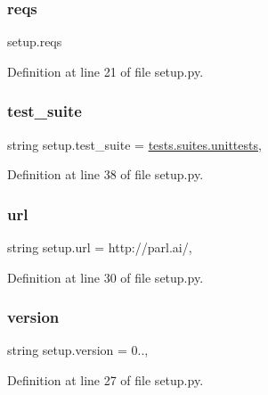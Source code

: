 \subsubsection{\texorpdfstring{reqs}{reqs}}
{\footnotesize\ttfamily setup.\+reqs}



Definition at line 21 of file setup.\+py.

\mbox{\label{namespacesetup_aaedcd7e0bf209e42aef838657a6bba4a}} 
\subsubsection{\texorpdfstring{test\+\_\+suite}{test\_suite}}
{\footnotesize\ttfamily string setup.\+test\+\_\+suite = \textquotesingle{}\hyperlink{namespacetests_1_1suites_a02a7d577493ceb024319292b96e13265}{tests.\+suites.\+unittests}\textquotesingle{},}



Definition at line 38 of file setup.\+py.

\mbox{\label{namespacesetup_a3376e8b9735800b5b9e455914cee908d}} 
\subsubsection{\texorpdfstring{url}{url}}
{\footnotesize\ttfamily string setup.\+url = \textquotesingle{}http\+://parl.\+ai/\textquotesingle{},}



Definition at line 30 of file setup.\+py.

\mbox{\label{namespacesetup_ab177531e7a80674a3db3de2d79eb8be7}} 
\subsubsection{\texorpdfstring{version}{version}}
{\footnotesize\ttfamily string setup.\+version = \textquotesingle{}0..\textquotesingle{},}



Definition at line 27 of file setup.\+py.

